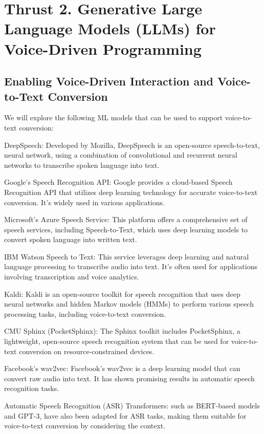 \section{Thrust 2. Generative Large Language Models (LLMs) for Voice-Driven Programming}
\label{sec:thrust2}

\subsection{Enabling Voice-Driven Interaction and Voice-to-Text Conversion}

We will explore the following ML models that
can be used to support voice-to-text conversion:

DeepSpeech: Developed by Mozilla, DeepSpeech is an open-source
speech-to-text, neural network, using a combination of
convolutional and recurrent neural networks to transcribe spoken
language into text.

Google's Speech Recognition API: Google provides a cloud-based Speech Recognition API that utilizes deep learning technology for accurate voice-to-text conversion. It's widely used in various applications.

Microsoft's Azure Speech Service: This platform offers a comprehensive set of speech services, including Speech-to-Text, which uses deep learning models to convert spoken language into written text.

IBM Watson Speech to Text: This service leverages deep learning and natural language processing to transcribe audio into text. It's often used for applications involving transcription and voice analytics.

Kaldi: Kaldi is an open-source toolkit for speech recognition that uses deep neural networks and hidden Markov models (HMMs) to perform various speech processing tasks, including voice-to-text conversion.

CMU Sphinx (PocketSphinx): The Sphinx toolkit includes PocketSphinx, a lightweight, open-source speech recognition system that can be used for voice-to-text conversion on resource-constrained devices.

Facebook's wav2vec: Facebook's wav2vec is a deep learning model that can convert raw audio into text. It has shown promising results in automatic speech recognition tasks.

Automatic Speech Recognition (ASR) Transformers: such as BERT-based models and GPT-3, have also been adapted for ASR tasks, making them suitable for voice-to-text conversion by considering the context.

